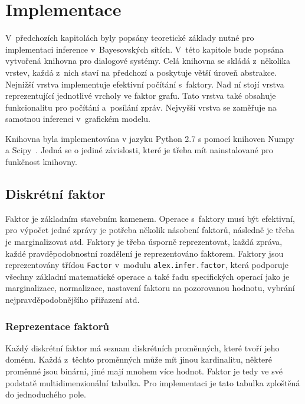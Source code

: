 \chapter{Implementace}
\label{ch:kap4}

V~předchozích kapitolách byly popsány teoretické základy nutné pro implementaci inference v~Bayesovských sítích.
V~této kapitole bude popsána vytvořená knihovna pro dialogové systémy.
Celá knihovna se skládá z~několika vrstev, každá z~nich staví na předchozí a poskytuje větší úroveň abstrakce.
Nejnižší vrstva implementuje efektivní počítání s~faktory.
Nad ní stojí vrstva reprezentující jednotlivé vrcholy ve faktor grafu.
Tato vrstva také obsahuje funkcionalitu pro počítání a~posílání zpráv.
Nejvyšší vrstva se zaměřuje na samotnou inferenci v~grafickém modelu.

Knihovna byla implementována v jazyku Python 2.7 s pomocí knihoven Numpy~\cite{oliphant-2006-guide} a Scipy~\cite{scipy}. 
Jedná se o jediné závislosti, které je třeba mít nainstalované pro funkčnost knihovny.

\section{Diskrétní faktor}

Faktor je základním stavebním kamenem.
Operace s~faktory musí být efektivní, pro výpočet jedné zprávy je potřeba několik násobení faktorů, následně je třeba je marginalizovat atd.
Faktory je třeba úsporně reprezentovat, každá zpráva, každé pravděpodobnostní rozdělení je reprezentováno faktorem.
Faktory jsou reprezentovány třídou \texttt{Factor} v~modulu \texttt{alex.infer.factor}, která podporuje všechny základní matematické operace a také řadu specifických operací jako je marginalizace, normalizace, nastavení faktoru na pozorovanou hodnotu, vybrání nejpravděpodobnějšího přiřazení atd.

\subsection{Reprezentace faktorů}
\label{sec:repfak}

Každý diskrétní faktor má seznam diskrétních proměnných, které tvoří jeho doménu.
Každá z~těchto proměnných může mít jinou kardinalitu, některé proměnné jsou binární, jiné mají mnohem více hodnot.
Faktor je tedy ve své podstatě multidimenzionální tabulka.
Pro implementaci je tato tabulka zploštěná do jednoduchého pole.

